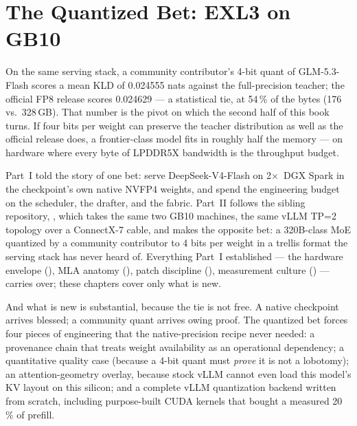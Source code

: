 \chapter{The Quantized Bet: EXL3 on GB10}
\label{ch:quantized-bet}

On the same serving stack, a community contributor's 4-bit quant of
GLM-5.3-Flash scores a mean KLD of 0.024555 nats against the full-precision
teacher; the official FP8 release scores 0.024629 --- a statistical tie, at
54\,\% of the bytes (176 vs.\ 328\,GB). That number is the pivot on which
the second half of this book turns. If four bits per weight can preserve the
teacher distribution as well as the official release does, a frontier-class
model fits in roughly half the memory --- on hardware where every byte of
LPDDR5X bandwidth is the throughput budget.

Part~I told the story of one bet: serve DeepSeek-V4-Flash on 2$\times$~DGX
Spark in the checkpoint's own native NVFP4 weights, and spend the engineering
budget on the scheduler, the drafter, and the fabric. Part~II follows the
sibling repository, , which takes the
same two GB10 machines, the same vLLM TP=2 topology over a ConnectX-7 cable,
and makes the opposite bet: a 320B-class MoE quantized by a community
contributor to 4 bits per weight in a trellis format the serving stack has
never heard of. Everything Part~I established --- the hardware envelope
(), MLA anatomy (), patch discipline
(), measurement culture () --- carries
over; these chapters cover only what is new.

And what is new is substantial, because the tie is not free. A native
checkpoint arrives blessed; a community quant arrives owing proof. The
quantized bet forces four pieces of engineering that the native-precision
recipe never needed: a provenance chain that treats weight availability as an
operational dependency; a quantitative quality case (because a 4-bit quant
must \emph{prove} it is not a lobotomy); an attention-geometry overlay,
because stock vLLM cannot even load this model's KV layout on this silicon;
and a complete vLLM quantization backend written from scratch, including
purpose-built CUDA kernels that bought a measured 20\,\% of prefill.

